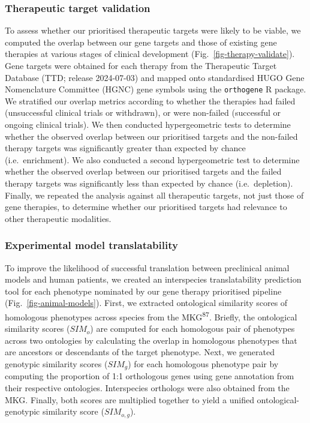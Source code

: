 \documentclass[
]{article}
\begin{document}
\subsubsection{Therapeutic target
validation}\label{therapeutic-target-validation-1}

To assess whether our prioritised therapeutic targets were likely to be
viable, we computed the overlap between our gene targets and those of
existing gene therapies at various stages of clinical development
(Fig.~\ref{fig-therapy-validate}). Gene targets were obtained for each
therapy from the Therapeutic Target Database (TTD; release 2024-07-03)
and mapped onto standardised HUGO Gene Nomenclature Committee (HGNC)
gene symbols using the \texttt{orthogene} R package. We stratified our
overlap metrics according to whether the therapies had failed
(unsuccessful clinical trials or withdrawn), or were non-failed
(successful or ongoing clinical trials). We then conducted
hypergeometric tests to determine whether the observed overlap between
our prioritised targets and the non-failed therapy targets was
significantly greater than expected by chance (i.e.~enrichment). We also
conducted a second hypergeometric test to determine whether the observed
overlap between our prioritised targets and the failed therapy targets
was significantly less than expected by chance (i.e.~depletion).
Finally, we repeated the analysis against all therapeutic targets, not
just those of gene therapies, to determine whether our prioritised
targets had relevance to other therapeutic modalities.

\subsubsection{Experimental model
translatability}\label{experimental-model-translatability-1}

To improve the likelihood of successful translation between preclinical
animal models and human patients, we created an interspecies
translatability prediction tool for each phenotype nominated by our gene
therapy prioritised pipeline (Fig.~\ref{fig-animal-models}). First, we
extracted ontological similarity scores of homologous phenotypes across
species from the MKG\textsuperscript{87}. Briefly, the ontological
similarity scores (\(SIM_o\)) are computed for each homologous pair of
phenotypes across two ontologies by calculating the overlap in
homologous phenotypes that are ancestors or descendants of the target
phenotype. Next, we generated genotypic similarity scores (\(SIM_g\))
for each homologous phenotype pair by computing the proportion of 1:1
orthologous genes using gene annotation from their respective
ontologies. Interspecies orthologs were also obtained from the MKG.
Finally, both scores are multiplied together to yield a unified
ontological-genotypic similarity score (\(SIM_{o,g}\)).
\end{document}
